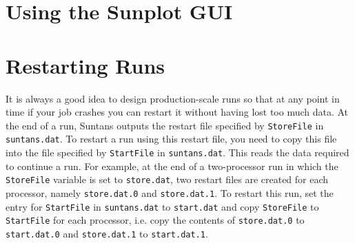 \documentclass[12pt,oneside]{article}
\begin{document}
\section{Using the Sunplot GUI}

\section{Restarting Runs} \label{sec:restart}

It is always a good idea to design production-scale runs so that at any point in time if your
job crashes you can restart it without having lost too much data.  At the end of a run, Suntans
outputs the restart file specified by \verb+StoreFile+ in \verb+suntans.dat+.  To restart a run using
this restart file, you need to copy this file into the file specified by \verb+StartFile+ in \verb+suntans.dat+.
This reads the data required to continue a run.  For example, at the end of a two-processor run in which
the \verb+StoreFile+ variable is set to \verb+store.dat+, two restart files are created for each processor, 
namely \verb+store.dat.0+ and \verb+store.dat.1+.  To restart this run, set the entry for \verb+StartFile+ in
\verb+suntans.dat+ to \verb+start.dat+ and copy \verb+StoreFile+ to \verb+StartFile+ for each processor, i.e.
copy the contents of \verb+store.dat.0+ to \verb+start.dat.0+ and \verb+store.dat.1+ to \verb+start.dat.1+.
\end{document}
